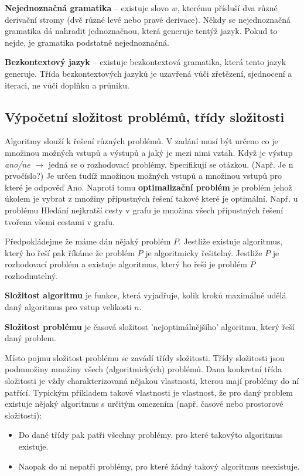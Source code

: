 \textbf{Nejednoznačná gramatika} -- existuje slovo $w$, kterému přísluší dva různé derivační stromy (dvě různé levé nebo pravé derivace).
Někdy se nejednoznačná gramatika dá nahradit jednoznačnou, která generuje tentýž jazyk. Pokud to nejde, je gramatika podstatně nejednoznačná.

\textbf{Bezkontextový jazyk} -- existuje bezkontextová gramatika, která tento jazyk generuje. Třída bezkontextových jazyků je uzavřená vůči zřetězení, sjednocení a iteraci, ne vůči doplňku a průniku.

\subsection{Výpočetní složitost problémů, třídy složitosti}
Algoritmy slouží k řešení různých problémů. V zadání musí být určeno co je množinou možných vstupů a výstupů a jaký je mezi nimi vztah. Když je výstup \textit{ano/ne} $\rightarrow$ jedná se o rozhodovací problémy. Specifikují se otázkou. (Např. Je n prvočíslo?) Je určen tudíž množinou možných vstupů a množinou vstupů pro které je odpověď Ano. Naproti tomu \textbf{optimalizační problém} je problém jehož úkolem je vybrat z množiny přípustných řešení takové které je optimální. Např. u problému Hledání nejkratší cesty v grafu je množina všech přípustných řešení tvořena všemi cestami v grafu.

Předpokládejme že máme dán nějaký problém $P$. Jestliže existuje algoritmus, který ho řeší pak říkáme že problém $P$ je algoritmicky řešitelný. Jestliže $P$ je rozhodovací problém a existuje algoritmus, který ho řeší je problém $P$ rozhodnutelný. 

\textbf{Složitost algoritmu} je funkce, která vyjadřuje, kolik kroků maximálně udělá daný algoritmus pro vstup velikosti $n$.

\textbf{Složitost problému} je časová složitost 'nejoptimálnějšího' algoritmu, který řeší daný problem.

Místo pojmu složitost problému se zavádí třídy složitosti. Třídy složitosti jsou podmnožiny množiny všech (algoritmických) problémů. Dana konkretní třída složitosti je vždy charakterizovaná nějakou vlastnosti, kterou mají problémy do ní patřící. Typickým příkladem takové vlastnosti je vlastnost, že pro daný problem existuje nějaký algoritmus s určitým omezením (např. časové nebo prostorové složitosti):
\begin{itemize}
\item Do dané třídy pak patři všechny problémy, pro které takovýto algoritmus existuje.
\item Naopak do ni nepatři problémy, pro které žádný takový algoritmus neexistuje.
\end{itemize}


